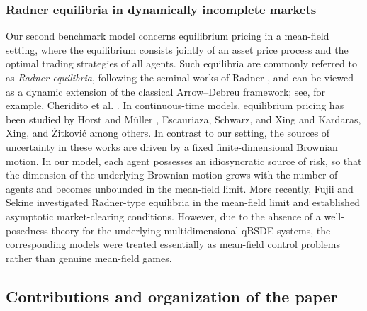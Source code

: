 \documentclass[10pt,a4paper]{article}
\theoremstyle{plain}
\theoremstyle{definition}
\numberwithin{equation}{section}
\begin{document}
\subsubsection{Radner equilibria in dynamically incomplete markets}

{Our second benchmark model concerns equilibrium pricing in a mean-field setting, where the equilibrium consists jointly of an asset price process and the optimal trading strategies of all agents. Such equilibria are commonly referred to as \emph{Radner equilibria}, following the seminal works of Radner \cite{Rad68,Rad72}, and can be viewed as a dynamic extension of the classical Arrow--Debreu framework; see, for example, Cheridito et al. \cite{CHKP16}. In continuous-time models, equilibrium pricing has been studied by Horst and M\"uller \cite{HM2007Spanning}, Escauriaza, Schwarz, and Xing \cite{EscauriazaSchwarzXing2022AAP} and Kardaras, Xing, and \v{Z}itkovi\'{c} \cite{Kardaras2022} among others. In contrast to our setting, the sources of uncertainty in these works are driven by a fixed finite-dimensional Brownian motion. In our model, each agent possesses an idiosyncratic source of risk, so that the dimension of the underlying Brownian motion grows with the number of agents and becomes unbounded in the mean-field limit. More recently, Fujii and Sekine \cite{RefN10,RefN9} investigated Radner-type equilibria in the mean-field limit and established asymptotic market-clearing conditions. However, due to the absence of a well-posedness theory for the underlying multidimensional qBSDE systems, the corresponding models were treated essentially as mean-field control problems rather than genuine mean-field games.

}

\subsection{ Contributions and organization of the paper}
\end{document}
